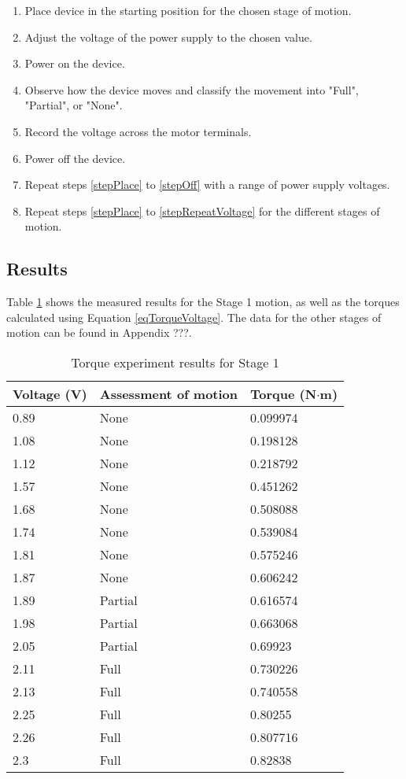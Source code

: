 \begin{enumerate}
	\item Place device in the starting position for the chosen stage of motion. \label{stepPlace}
	\item Adjust the voltage of the power supply to the chosen value.
	\item Power on the device.
	\item Observe how the device moves and classify the movement into "Full", "Partial", or "None". 
	\item Record the voltage across the motor terminals. 
	\item Power off the device.\label{stepOff}
	\item Repeat steps \ref{stepPlace} to \ref{stepOff} with a range of power supply voltages.\label{stepRepeatVoltage}
	\item Repeat steps \ref{stepPlace} to \ref{stepRepeatVoltage} for the different stages of motion.
\end{enumerate}

\subsection{Results}

Table \ref{tab:Stage1Torque} shows the measured results for the Stage 1 motion, as well as the torques calculated using Equation \ref{eqTorqueVoltage}. The data for the other stages of motion can be found in Appendix ???.

\begin{table}[!h]
	\centering
	\caption{Torque experiment results for Stage 1}
	\label{tab:Stage1Torque}
	\begin{tabular}{|l|l|l|}
		\hline
		Voltage (V) & Assessment of motion & Torque (N$\cdot$m) \\ \hline
		0.89 & None & 0.099974 \\ \hline
		1.08 & None & 0.198128 \\ \hline
		1.12 & None & 0.218792 \\ \hline
		1.57 & None & 0.451262 \\ \hline
		1.68 & None & 0.508088 \\ \hline
		1.74 & None & 0.539084 \\ \hline
		1.81 & None & 0.575246 \\ \hline
		1.87 & None & 0.606242 \\ \hline
		1.89 & Partial & 0.616574 \\ \hline
		1.98 & Partial & 0.663068 \\ \hline
		2.05 & Partial & 0.69923 \\ \hline
		2.11 & Full & 0.730226 \\ \hline
		2.13 & Full & 0.740558 \\ \hline
		2.25 & Full & 0.80255 \\ \hline
		2.26 & Full & 0.807716 \\ \hline
		2.3 & Full & 0.82838 \\ \hline
	\end{tabular}
\end{table}

